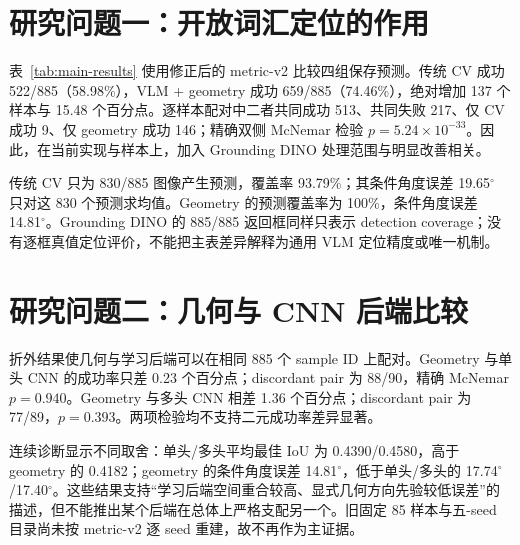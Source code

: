 \documentclass{l4proj}
\begin{document}
\section{研究问题一：开放词汇定位的作用}
表~\ref{tab:main-results} 使用修正后的 metric-v2 比较四组保存预测。传统 CV 成功 522/885（58.98\%），VLM + geometry 成功 659/885（74.46\%），绝对增加 137 个样本与 15.48 个百分点。逐样本配对中二者共同成功 513、共同失败 217、仅 CV 成功 9、仅 geometry 成功 146；精确双侧 McNemar 检验 $p=5.24\times10^{-33}$。因此，在当前实现与样本上，加入 Grounding DINO 处理范围与明显改善相关。

传统 CV 只为 830/885 图像产生预测，覆盖率 93.79\%；其条件角度误差 19.65$^\circ$ 只对这 830 个预测求均值。Geometry 的预测覆盖率为 100\%，条件角度误差 14.81$^\circ$。Grounding DINO 的 885/885 返回框同样只表示 detection coverage；没有逐框真值定位评价，不能把主表差异解释为通用 VLM 定位精度或唯一机制。

\begin{table}[htbp]
  \centering
  \caption{Cornell metric-v2 主结果。CNN 为 885 条 image-wise 五折折外预测；角度只对实际预测求均值，覆盖率单列。}
  \label{tab:main-results}
\end{table}

\section{研究问题二：几何与 CNN 后端比较}
折外结果使几何与学习后端可以在相同 885 个 sample ID 上配对。Geometry 与单头 CNN 的成功率只差 0.23 个百分点；discordant pair 为 88/90，精确 McNemar $p=0.940$。Geometry 与多头 CNN 相差 1.36 个百分点；discordant pair 为 77/89，$p=0.393$。两项检验均不支持二元成功率差异显著。

连续诊断显示不同取舍：单头/多头平均最佳 IoU 为 0.4390/0.4580，高于 geometry 的 0.4182；geometry 的条件角度误差 14.81$^\circ$，低于单头/多头的 17.74$^\circ$/17.40$^\circ$。这些结果支持“学习后端空间重合较高、显式几何方向先验较低误差”的描述，但不能推出某个后端在总体上严格支配另一个。旧固定 85 样本与五-seed 目录尚未按 metric-v2 逐 seed 重建，故不再作为主证据。
\end{document}

